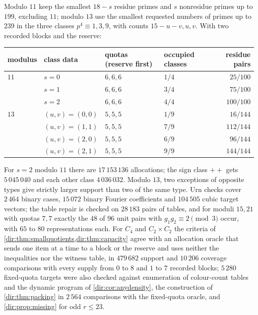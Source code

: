 \begin{example}\label{dir:ex:disjoint}
Modulo $11$ keep the smallest $18-s$ residue primes and $s$ nonresidue primes up to $199$, excluding
$11$; modulo $13$ use the smallest requested numbers of primes up to $239$ in the three classes
$p^4\equiv1,3,9$, with counts $15-u-v,u,v$. With two recorded blocks and the reserve:
\begin{center}\small
\begin{tabular}{@{}llllr@{}}
\toprule
modulus & class data & quotas (reserve first) & occupied classes & residue pairs\\
\midrule
$11$ & $s=0$ & $6,6,6$ & $1/4$ & $25/100$\\
 & $s=1$ & $6,6,6$ & $3/4$ & $75/100$\\
 & $s=2$ & $6,6,6$ & $4/4$ & $100/100$\\
$13$ & $(u,v)=(0,0)$ & $5,5,5$ & $1/9$ & $16/144$\\
 & $(u,v)=(1,1)$ & $5,5,5$ & $7/9$ & $112/144$\\
 & $(u,v)=(2,0)$ & $5,5,5$ & $6/9$ & $96/144$\\
 & $(u,v)=(2,1)$ & $5,5,5$ & $9/9$ & $144/144$\\
\bottomrule
\end{tabular}
\end{center}
For $s=2$ modulo $11$ there are $17\,153\,136$ allocations; the sign class $++$ gets $5\,045\,040$ and
each other class $4\,036\,032$. Modulo $13$, two exceptions of opposite types give strictly larger
support than two of the same type. Urn checks cover $2\,464$ binary cases, $15\,072$ binary Fourier
coefficients and $104\,505$ cubic target vectors; the table repair is checked on $28\,183$ pairs of
tables, and for moduli $15,21$ with quotas $7,7$ exactly the $48$ of $96$ unit pairs with
$g_1g_2\equiv2\pmod3$ occur, with $65$ to $80$ representations each.
For $C_4$ and $C_2\times C_2$ the criteria of \cref{dir:thm:smallquotients,dir:thm:capacity} agree with an
allocation oracle that sends one item at a time to a block or the reserve and uses neither the
inequalities nor the witness table, in $479\,682$ support and $10\,206$ coverage comparisons with every
supply from $0$ to $8$ and $1$ to $7$ recorded blocks; $5\,280$ fixed-quota targets were also checked
against enumeration of colour-count tables and the dynamic program of \cref{dir:cor:anydensity},
the construction of \cref{dir:thm:packing} in $2\,564$ comparisons with the fixed-quota oracle, and
\cref{dir:prop:missing} for odd $r\le23$.
\end{example}

